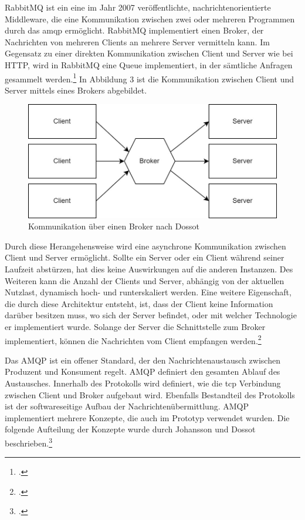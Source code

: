 RabbitMQ ist ein eine im Jahr 2007 veröffentlichte, nachrichtenorientierte Middleware, die eine Kommunikation zwischen zwei oder mehreren Programmen durch das \ac{amqp} ermöglicht. RabbitMQ implementiert einen Broker, der Nachrichten von mehreren Clients an mehrere Server vermitteln kann. Im Gegensatz zu einer direkten Kommunikation zwischen Client und Server wie bei HTTP, wird in RabbitMQ eine Queue implementiert, in der sämtliche Anfragen gesammelt werden.\footcite{JohanssonLovisa2020REBD} In Abbildung 3 ist die Kommunikation zwischen Client und Server mittels eines Brokers abgebildet.
 
\begin{figure}[H]
  \centering
    \includegraphics[width = 12cm]{bilder/Rabbit2}
    \caption{Kommunikation über einen Broker nach Dossot}
\end{figure}

Durch diese Herangehensweise wird eine asynchrone Kommunikation zwischen Client und Server ermöglicht. Sollte ein Server oder ein Client während seiner Laufzeit abstürzen, hat dies keine Auswirkungen auf die anderen Instanzen. Des Weiteren kann die Anzahl der Clients und Server, abhängig von der aktuellen Nutzlast, dynamisch hoch- und runterskaliert werden. Eine weitere Eigenschaft, die durch diese Architektur entsteht, ist, dass der Client keine Information darüber besitzen muss, wo sich der Server befindet, oder mit welcher Technologie er implementiert wurde. Solange der Server die Schnittstelle zum Broker implementiert, können die Nachrichten vom Client empfangen werden.\footcite{dossot2014rabbitmq}

Das AMQP ist ein offener Standard, der den Nachrichtenaustausch zwischen Produzent und Konsument regelt. AMQP definiert den gesamten Ablauf des Austausches. Innerhalb des Protokolls wird definiert, wie die \ac{tcp} Verbindung zwischen Client und Broker aufgebaut wird. Ebenfalls Bestandteil des Protokolls ist der softwareseitige Aufbau der Nachrichtenübermittlung. AMQP implementiert mehrere Konzepte, die auch im Prototyp verwendet wurden. Die folgende Aufteilung der Konzepte wurde durch Johansson und Dossot beschrieben.\footcite{JohanssonLovisa2020REBD}

